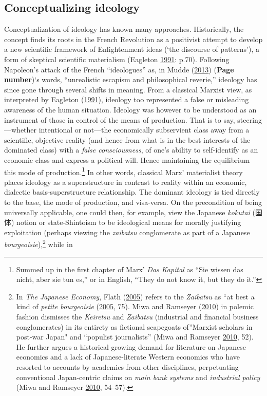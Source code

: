 \documentclass[10pt,british,A4paper,,openany]{memoir}
\begin{document}
\subsection{Conceptualizing ideology}\label{conceptualizing-ideology}

Conceptualization of ideology has known many approaches. Historically,
the concept finds its roots in the French Revolution as a positivist
attempt to develop a new scientific framework of Enlightenment ideas
(`the discourse of patterns'), a form of skeptical scientific
materialism (Eagleton
\protect\hyperlink{ref-eagleton_ideology:_1991}{1991}: p.70). Following
Napoleon's attack of the French ``ideologues'' as, in Mudde
(\protect\hyperlink{ref-mudde_oxford_2013}{2013}) (\textbf{Page
number})`s words, ``unrealistic escapism and philosophical reverie,''
ideology has since gone through several shifts in meaning. From a
classical Marxist view, as interpreted by Eagleton
(\protect\hyperlink{ref-eagleton_ideology:_1991}{1991}), ideology too
represented a false or misleading awareness of the human situation.
Ideology was however to be understood as an instrument of those in
control of the means of production. That is to say, steering---whether
intentional or not---the economically subservient class away from a
scientific, objective reality (and hence from what is in the best
interests of the dominated class) with a \emph{false consciousness}, of
one's ability to self-identify as an economic class and express a
political will. Hence maintaining the equilibrium this mode of
production.\footnote{Summed up in the first chapter of Marx' \emph{Das
  Kapital} as ``Sie wissen das nicht, aber sie tun es,'' or in English,
  ``They do not know it, but they do it.''} In other words, classical
Marx' materialist theory places ideology as a superstructure in contrast
to reality within an economic, dialectic basis-superstructure
relationship. The dominant ideology is tied directly to the base, the
mode of production, and visa-versa. On the precondition of being
universally applicable, one could then, for example, view the Japanese
\emph{kokutai} (国体) notion or state-Shintoism to be ideological means
for morally justifying exploitation (perhaps viewing the \emph{zaibatsu}
conglomerate as part of a Japanese \emph{bourgeoisie}),\footnote{In
  \emph{The Japanese Economy}, Flath
  (\protect\hyperlink{ref-flath_japanese_2005}{2005}) refers to the
  \emph{Zaibatsu} as ``at best a kind of \emph{petite bourgeoisie}
  (\protect\hyperlink{ref-flath_japanese_2005}{2005}, 75). Miwa and
  Ramseyer (\protect\hyperlink{ref-miwa_fable_2010}{2010}) in polemic
  fashion dismisses the \emph{Keiretsu} and \emph{Zaibatsu} (industrial
  and financial business conglomerates) in its entirety as fictional
  scapegoats of''Marxist scholars in post-war Japan" and ``populist
  journalists'' (Miwa and Ramseyer
  \protect\hyperlink{ref-miwa_fable_2010}{2010}, 52). He further argues
  a historical growing demand for literature on Japanese economics and a
  lack of Japanese-literate Western economics who have resorted to
  accounts by academics from other disciplines, perpetuating
  conventional Japan-centric claims on \emph{main bank systems} and
  \emph{industrial policy} (Miwa and Ramseyer
  \protect\hyperlink{ref-miwa_fable_2010}{2010}, 54--57).} while in
\end{document}
